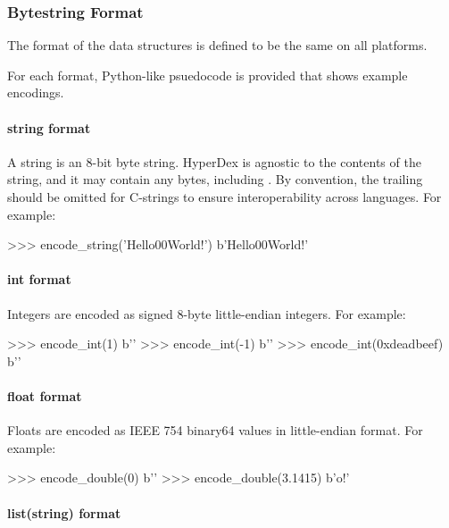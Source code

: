 \subsubsection{Bytestring Format}
\label{sec:api:c:client:format}

The format of the data structures is defined to be the same on all platforms.

For each format, Python-like psuedocode is provided that shows example
encodings.

\paragraph{string format}

A string is an 8-bit byte string.  HyperDex is agnostic to the contents of the
string, and it may contain any bytes, including .  By convention,
the trailing  should be omitted for C-strings to ensure
interoperability across languages.  For example:

\begin{pythoncode}
>>> encode_string('Hello\x00World!')
b'Hello\x00World!'
\end{pythoncode}

\paragraph{int format}

Integers are encoded as signed 8-byte little-endian integers.  For example:

\begin{pythoncode}
>>> encode_int(1)
b''
>>> encode_int(-1)
b'\xff\xff\xff\xff\xff\xff\xff\xff'
>>> encode_int(0xdeadbeef)
b'\xef\xbe\xad\xde{}'
\end{pythoncode}

\paragraph{float format}

Floats are encoded as IEEE 754 binary64 values in little-endian format.  For
example:

\begin{pythoncode}
>>> encode_double(0)
b''
>>> encode_double(3.1415)
b'o\xca!\t@'
\end{pythoncode}

\paragraph{list(string) format}

